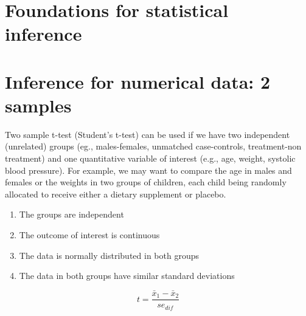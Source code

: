 \documentclass[
  16pt,
  letterpaper,
]{scrbook}
\providecommand{\tightlist}{%
  \setlength{\itemsep}{0pt}\setlength{\parskip}{0pt}}\usepackage{longtable,booktabs,array}
\begin{document}

\hypertarget{foundations-for-statistical-inference}{%
\chapter{Foundations for statistical
inference}\label{foundations-for-statistical-inference}}


\hypertarget{inference-for-numerical-data-2-samples}{%
\chapter{Inference for numerical data: 2
samples}\label{inference-for-numerical-data-2-samples}}

Two sample t-test (Student's t-test) can be used if we have two
independent (unrelated) groups (eg., males-females, unmatched
case-controls, treatment-non treatment) and one quantitative variable of
interest (e.g., age, weight, systolic blood pressure). For example, we
may want to compare the age in males and females or the weights in two
groups of children, each child being randomly allocated to receive
either a dietary supplement or placebo.

\begin{tcolorbox}[enhanced jigsaw, opacitybacktitle=0.6, bottomrule=.15mm, titlerule=0mm, colback=white, leftrule=.75mm, breakable, colframe=quarto-callout-warning-color-frame, bottomtitle=1mm, colbacktitle=quarto-callout-warning-color!10!white, toprule=.15mm, left=2mm, opacityback=0, coltitle=black, arc=.35mm, title={\textbf{Assumptions for conducting a Student's t-test}}, rightrule=.15mm, toptitle=1mm]

\begin{enumerate}
\def\labelenumi{\arabic{enumi}.}
\tightlist
\item
  The groups are independent
\item
  The outcome of interest is continuous
\item
  The data is normally distributed in both groups
\item
  The data in both groups have similar standard deviations
\end{enumerate}

\end{tcolorbox}

\[t = \frac{\bar{x}_{1} - \bar{x}_{2}}{se_{dif}}\]

\end{document}
